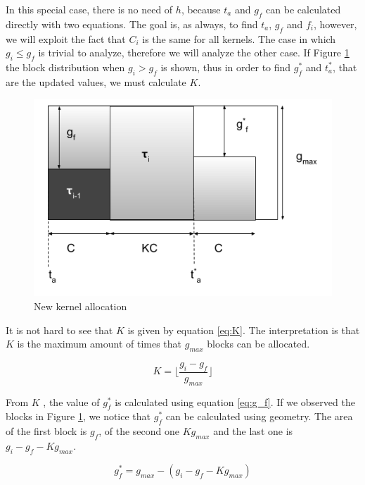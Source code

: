 \documentclass[
  12pt,
  a4paperpaper,
]{report}
\begin{document}
In this special case, there is no need of \(h\), because \(t_a\) and
\(g_f\) can be calculated directly with two equations. The goal is, as
always, to find \(t_a\), \(g_f\) and \(f_i\), however, we will exploit
the fact that \(C_i\) is the same for all kernels. The case in which
\(g_i \leq g_f\) is trivial to analyze, therefore we will analyze the
other case. If Figure \ref{img:free_blocks_alg} the block
distribution when \(g_i > g_f\) is shown, thus in order to find \(g^{*}_f\) and
\(t^{*}_a\), that are the updated values, we must calculate \(K\).

\begin{figure}
\centering
\includegraphics{source/figures/free_blocks_alg.png}
\caption{New kernel allocation \label{img:free_blocks_alg}}
\end{figure}

It is not hard to see that \(K\) is given by equation \ref{eq:K}. The
interpretation is that \(K\) is the maximum amount of times that
\(g_{max}\) blocks can be allocated.

\begin{equation}
K = \lfloor \frac{g_i - g_f}{g_{max}} \rfloor
\label{eq:K}
\end{equation}

From \(K\) , the value of \(g^{*}_f\) is calculated using equation
\ref{eq:g_f}. If we observed the blocks in Figure
\ref{img:free_blocks_alg}, we notice that \(g^{*}_f\) can be calculated
using geometry. The area of the first block is \(g_f\), of the second
one \(Kg_{max}\) and the last one is \(g_i - g_f - K g_{max}\).

\begin{equation}
g^{*}_f = g_{max} - (g_i -  g_f - K g_{max} )
\label{eq:g_f}
\end{equation}
\end{document}
